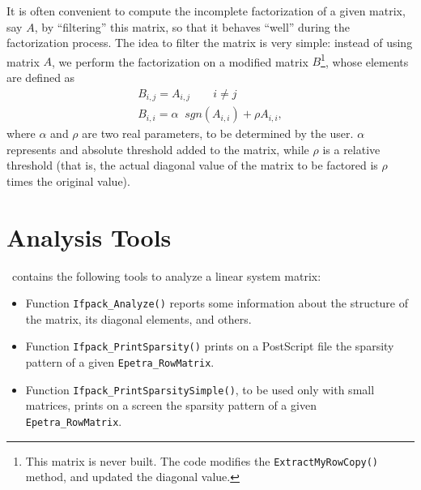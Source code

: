 
\smallskip

It is often convenient to compute the incomplete factorization of a given
matrix, say $A$, by ``filtering'' this matrix, so that it behaves ``well''
during the factorization process. The idea to filter the matrix is very
simple: instead of using matrix $A$, we perform the factorization  on 
a modified matrix $B$\footnote{This matrix is never built. The code modifies
  the {\tt ExtractMyRowCopy()} method, and updated the diagonal value.}, whose elements are defined as
\begin{equation}
\label{eq:B}
\begin{array}{lcr}
B_{i,j} = A_{i,j} \quad \quad i \neq j \\
B_{i,i} = \alpha \; \; sgn(A_{i,i}) + \rho A_{i,i},
  \end{array}
\end{equation}
where $\alpha$ and $\rho$ are two real parameters, to be determined by the
user. $\alpha$ represents and absolute threshold added to the matrix, while
$\rho$ is a relative threshold (that is, the actual diagonal value of the matrix to
be factored is $\rho$ times the original value). 

\smallskip




\section{Analysis Tools}
\label{sec:analysis}

\ifpack\ contains the following tools to analyze a linear system matrix:
\begin{itemize}
\item Function {\tt Ifpack\_Analyze()} reports some information about the
structure of the matrix, its diagonal elements, and others.
\item Function {\tt Ifpack\_PrintSparsity()} prints on a PostScript file the
sparsity pattern of a given {\tt Epetra\_RowMatrix}.
\item Function {\tt Ifpack\_PrintSparsitySimple()}, to be used only with small
matrices, prints on a screen the
sparsity pattern of a given {\tt Epetra\_RowMatrix}.
\end{itemize}


